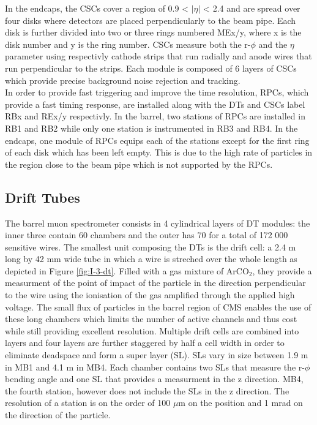     In the endcaps, the CSCs cover a region of 0.9 < $ | \eta | $ < 2.4 and are spread over four disks where detectors are placed perpendicularly to the beam pipe. Each disk is further divided into two or three rings numbered MEx/y, where x is the disk number and y is the ring number. CSCs measure both the r-$\phi$ and the $ \eta $ parameter using respectivly cathode strips that run radially and anode wires that run perpendicular to the strips. Each module is composed of 6 layers of CSCs which provide precise background noise rejection and tracking. \\

    In order to provide fast triggering and improve the time resolution, RPCs, which provide a fast timing response, are installed along with the DTs and CSCs label RBx and REx/y respectivly. In the barrel, two stations of RPCs are installed in RB1 and RB2 while only one station is instrumented in RB3 and RB4. In the endcaps, one module of RPCs equips each of the stations except for the first ring of each disk which has been left empty. This is due to the high rate of particles in the region close to the beam pipe which is not supported by the RPCs.

    \subsection{Drift Tubes}

      The barrel muon spectrometer consists in 4 cylindrical layers of DT modules: the inner three contain 60 chambers and the outer has 70 for a total of 172 000 sensitive wires. The smallest unit composing the DTs is the drift cell: a 2.4 m long by 42 mm wide tube in which a wire is streched over the whole length as depicted in Figure \ref{fig:I-3-dt}. Filled with a gas mixture of ArCO$_2$, they provide a measurment of the point of impact of the particle in the direction perpendicular to the wire using the ionisation of the gas amplified through the applied high voltage. The small flux of particles in the barrel region of CMS enables the use of these long chambers which limits the number of active channels and thus cost while still providing excellent resolution. Multiple drift cells are combined into layers and four layers are further staggered by half a cell width in order to eliminate deadspace and form a super layer (SL). SLs vary in size between 1.9 m in MB1 and 4.1 m in MB4. Each chamber contains two SLs that measure the r-$\phi$ bending angle and one SL that provides a measurment in the z direction. MB4, the fourth station, however does not include the SLs in the z direction. The resolution of a station is on the order of 100 $\mu$m on the position and 1 mrad on the direction of the particle. \\

